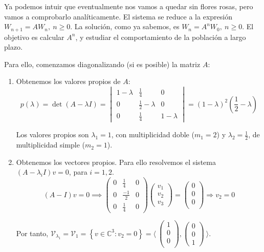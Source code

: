 \documentclass[11pt, a4paper]{article}
\newif\IfInSansMode
\numberwithin{equation}{section}
\newcommand{\la}{\lambda}
\theoremstyle{theorem-style}
\theoremstyle{definition-style}
\theoremstyle{remark-style}
\theoremstyle{example-style}
\newenvironment{nlist}
{\begin{enumerate}
    \renewcommand\labelenumi{(\emph{\roman{enumi})}}}
  {\end{enumerate}}
\begin{document}
Ya podemos intuir que eventualmente nos vamos a quedar sin flores rosas, pero
vamos a comprobarlo analíticamente.
El sistema se reduce a la expresión $W_{n+1} = AW_n,\ n \geq 0$. La solución, como ya sabemos, es $W_n = A^nW_0,\ n \ge 0$. El objetivo es calcular $A^n$, y estudiar el comportamiento de la población a largo plazo.

Para ello, comenzamos diagonalizando (si es posible) la matriz $A$:

\begin{nlist}
\item Obtenemos los valores propios de $A$:
  $$p(\la) = \det(A - \lambda I) =
  \begin{vmatrix}
    1 - \lambda & \frac{1}{4} & 0 \\
    0 & \frac{1}{2} - \lambda & 0 \\
    0 & \frac{1}{4} & 1 - \lambda
  \end{vmatrix} = (1-\lambda)^2(\frac{1}{2} - \lambda)$$

  Los valores propios son $\lambda_1 = 1$, con multiplicidad doble ($m_1 = 2$) y
  $\lambda_2 = \frac{1}{2}$, de multiplicidad simple ($m_2 = 1$).
\item Obtenemos los vectores propios. Para ello resolvemos el sistema $(A - \la_iI)v
  = 0$, para $i=1,2$.
  $$ (A - I)v = 0 \implies
  \begin{pmatrix}
    0 & \frac{1}{4} & 0 \\
    0 & \frac{-1}{2} & 0 \\
    0 & \frac{1}{4} & 0
  \end{pmatrix}
  \begin{pmatrix}
    v_1 \\
    v_2 \\
    v_3 
  \end{pmatrix} =
  \begin{pmatrix}
    0 \\
    0 \\
    0 \\
  \end{pmatrix} \Rightarrow v_2 = 0$$

  Por tanto, $\mathcal V_{\lambda_1} = \mathcal V_1 = \left\{ v \in \mathbb C^3 : v_2 = 0 \right\} = \langle \
  \begin{pmatrix}
    1 \\
    0 \\
    0 \\
  \end{pmatrix},
  \begin{pmatrix}
    0 \\
    0 \\
    1
  \end{pmatrix}\ \rangle$. 
  

\end{nlist}
\end{document}
